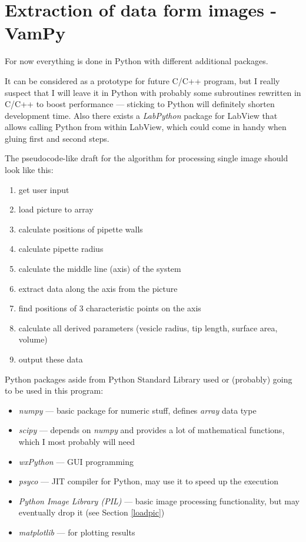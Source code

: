 \section{Extraction of data form images - VamPy}\label{data}

For now everything is done in Python with different additional packages.

It can be considered as a prototype for future C/C++ program, but I really suspect that I will leave it in Python with probably some subroutines rewritten in C/C++ to boost performance --- sticking to Python will definitely shorten development time. Also there exists a \emph{LabPython} package for LabView that allows calling Python from within LabView, which could come in handy when gluing first and second steps.

The pseudocode-like draft for the algorithm for processing single image should look like this:
\begin{enumerate}
  \item get user input
  \item load picture to array
  \item calculate positions of pipette walls
  \item calculate pipette radius
  \item calculate the middle line (axis) of the system
  \item extract data along the axis from the picture
  \item find positions of 3 characteristic points on the axis
  \item calculate all derived parameters (vesicle radius, tip length, surface area, volume)
  \item output these data
\end{enumerate}

Python packages aside from Python Standard Library used or (probably) going to be used in this program:
\begin{itemize}
	\item \emph{numpy} --- basic package for numeric stuff, defines \emph{array} data type
	\item \emph{scipy} --- depends on \emph{numpy} and provides a lot of mathematical functions, which I most probably will need \cite{scipy}
	\item \emph{wxPython} --- GUI programming
	\item \emph{psyco} --- JIT compiler for Python, may use it to speed up the execution
	\item \emph{Python Image Library (PIL)} --- basic image processing functionality, but may eventually drop it (see Section \ref{loadpic})
	\item \emph{matplotlib} --- for plotting results
\end{itemize}

